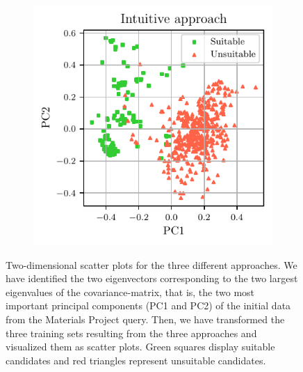 \documentclass[superscriptaddress,unsortedaddress,
 amsmath,amssymb,
 aps,
]{revtex4-2}
\begin{document}
\begin{figure}
\begin{subfigure}{0.3\textwidth}
    \end{subfigure}
    \begin{subfigure}{0.3\textwidth}
        \centering
        \includegraphics[width=1\textwidth]{figures/pca-2d-plots/03-insightful-approach-v2.pdf}
    \end{subfigure}
    \caption{Two-dimensional scatter plots for the three different approaches. We have identified the two eigenvectors corresponding to the two largest eigenvalues of the covariance-matrix, that is, the two most important principal components (PC1 and PC2) of the initial data from the Materials Project query. Then, we have transformed the three training sets resulting from the three approaches and visualized them as scatter plots. Green squares display suitable candidates and red triangles represent unsuitable candidates.}
    \label{fig:2dscatterplotpca}
\end{figure}
\end{document}
